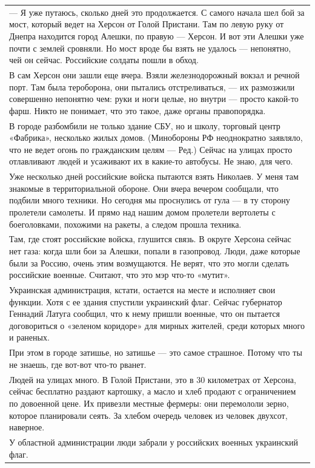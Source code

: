 {
\centering
\begin{longtable}[c]{p{12cm}}
    --- Я уже путаюсь, сколько дней это продолжается. С самого начала шел бой за мост, который ведет на Херсон от Голой Пристани. Там по левую руку от Днепра находится город Алешки, по правую --- Херсон. И вот эти Алешки уже почти с землей сровняли. Но мост вроде бы взять не удалось --- непонятно, чей он сейчас. Российские солдаты пошли в обход.
    \\[1em]
    В сам Херсон они зашли еще вчера. Взяли железнодорожный вокзал и речной порт. Там была тероборона, они пытались отстреливаться, --- их размозжили совершенно непонятно чем: руки и ноги целые, но внутри --- просто какой-то фарш. Никто не понимает, что это такое, даже органы правопорядка.
    \\[1em]
    В городе разбомбили не только здание СБУ, но и школу, торговый центр «Фабрика», несколько жилых домов. (Минобороны РФ неоднократно заявляло, что не ведет огонь по гражданским целям --- Ред.) Сейчас на улицах просто отлавливают людей и усаживают их в какие-то автобусы. Не знаю, для чего.
    \\[1em]
    Уже несколько дней российские войска пытаются взять Николаев. У меня там знакомые в территориальной обороне. Они вчера вечером сообщали, что подбили много техники. Но сегодня мы проснулись от гула --- в ту сторону пролетели самолеты. И прямо над нашим домом пролетели вертолеты с боеголовками, похожими на ракеты, а следом прошла техника.
    \\[1em]
    Там, где стоят российские войска, глушится связь. В округе Херсона сейчас нет газа: когда шли бои за Алешки, попали в газопровод. Люди, даже которые были за Россию, очень этим возмущаются. Не верят, что это могли сделать российские военные. Считают, что это мэр что-то «мутит».
    \\[1em]
    Украинская администрация, кстати, остается на месте и исполняет свои функции. Хотя с ее здания спустили украинский флаг. Сейчас губернатор Геннадий Латуга сообщил, что к нему пришли военные, что он пытается договориться о «зеленом коридоре» для мирных жителей, среди которых много и раненых.
    \\[1em]
    При этом в городе затишье, но затишье --- это самое страшное. Потому что ты не знаешь, где вот-вот что-то рванет.
    \\[1em]
    Людей на улицах много. В Голой Пристани, это в 30 километрах от Херсона, сейчас бесплатно раздают картошку, а масло и хлеб продают с ограничением по довоенной цене. Их привезли местные фермеры: они перемололи зерно, которое планировали сеять. За хлебом очередь человек из человек двухсот, наверное.
    \\[1em]
    У областной администрации люди забрали у российских военных украинский флаг.
\end{longtable}
}


